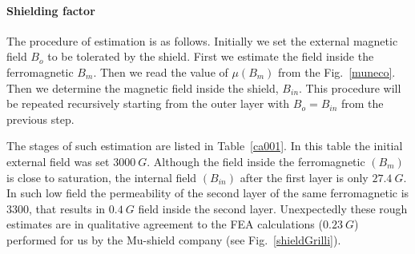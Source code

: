 \documentclass[12pt]{article}
\begin{document}
\paragraph{Shielding factor}
The procedure of estimation is as follows.
Initially we set the  external magnetic field $B_o$ to be 
tolerated by the shield.
First we estimate the field inside the ferromagnetic $B_m$.
Then  we read the value of $\mu(B_m)$ from the Fig.~\ref{muneco}.
Then  we  determine the magnetic field inside the shield, $B_{in}$.
This  procedure will be repeated recursively starting from the outer layer 
with  $B_o=B_{in}$ from the previous step.

The stages  of   such estimation are listed in Table~\ref{ca001}.
In this table  the initial external field was  set $3000~G$.
Although the field inside the ferromagnetic $(B_m)$ is close to saturation,
the internal field $(B_{in})$ after the first layer  is only $27.4~G$. 
In such low field the permeability of the second layer of the same ferromagnetic 
is 3300, that results in $0.4~G$ field inside the second layer. 
Unexpectedly these rough  estimates  are in qualitative   agreement to the FEA
calculations ($0.23~G$) performed for us by the Mu-shield company (see Fig.~\ref{shieldGrilli}).
%
\end{document}
